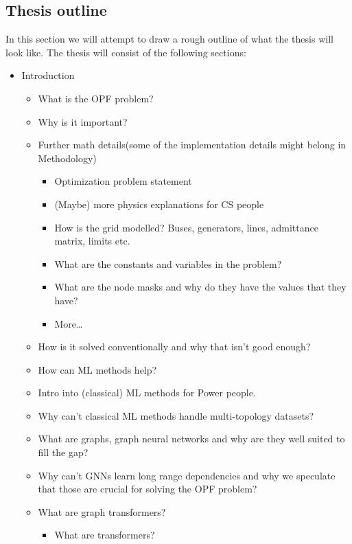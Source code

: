 \subsection*{Thesis outline}

In this section we will attempt to draw a rough outline of what the thesis will look like.
The thesis will consist of the following sections:

\begin{itemize}
    \item Introduction
    \begin{itemize}
        \item What is the OPF problem?
        \item Why is it important?
        \item Further math details(some of the implementation details might belong in Methodology)
        \begin{itemize}
            \item Optimization problem statement
            \item (Maybe) more physics explanations for CS people
            \item How is the grid modelled?
            Buses, generators, lines, admittance matrix, limits etc.
            \item What are the constants and variables in the problem?
            \item What are the node masks and why do they have the values that they have?
            \item More\ldots
        \end{itemize}
        \item How is it solved conventionally and why that isn't good enough?
        \item How can ML methods help?
        \item Intro into (classical) ML methods for Power people.
        \item Why can't classical ML methods handle multi-topology datasets?
        \item What are graphs, graph neural networks and why are they well suited to fill the gap?
        \item Why can't GNNs learn long range dependencies and why we speculate that those are crucial for solving the OPF problem?
        \item What are graph transformers?
        \begin{itemize}
            \item What are transformers?

\end{itemize}
\end{itemize}
\end{itemize}
